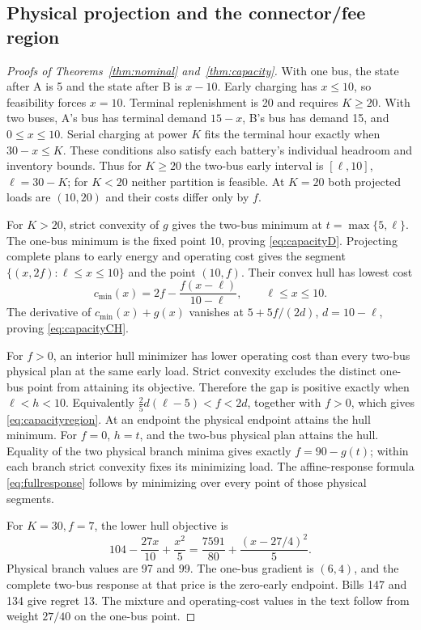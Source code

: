 \subsection{Physical projection and the connector/fee region}\label{app:capacity}
\begin{proof}[Proofs of Theorems~\ref{thm:nominal} and~\ref{thm:capacity}]
With one bus, the state after A is 5 and the state after B is $x-10$.
Early charging has $x\le10$, so feasibility forces $x=10$. Terminal
replenishment is 20 and requires $K\ge20$. With two buses, A's bus has
terminal demand $15-x$, B's bus has demand 15, and $0\le x\le10$.
Serial charging at power $K$ fits the terminal hour exactly when
$30-x\le K$. These conditions also satisfy each battery's individual
headroom and inventory bounds. Thus for $K\ge20$ the two-bus early
interval is $[\ell,10]$, $\ell=30-K$; for $K<20$ neither partition
is feasible. At $K=20$ both projected loads are $(10,20)$ and their
costs differ only by $f$.

For $K>20$, strict convexity of $g$ gives the two-bus minimum at
$t=\max\{5,\ell\}$. The one-bus minimum is the fixed point 10,
proving \eqref{eq:capacityD}. Projecting complete plans to early energy
and operating cost gives the segment $\{(x,2f):\ell\le x\le10\}$
and the point $(10,f)$. Their convex hull has lowest cost
\[
 c_{\min}(x)=2f-\frac{f(x-\ell)}{10-\ell},\qquad\ell\le x\le10.
\]
The derivative of $c_{\min}(x)+g(x)$ vanishes at
$5+5f/(2d)$, $d=10-\ell$, proving \eqref{eq:capacityCH}.

For $f>0$, an interior hull minimizer has lower operating cost than every
two-bus physical plan at the same early load. Strict convexity excludes
the distinct one-bus point from attaining its objective. Therefore the
gap is positive exactly when $\ell<h<10$. Equivalently
$\tfrac25d(\ell-5)<f<2d$, together with $f>0$, which gives
\eqref{eq:capacityregion}. At an endpoint the physical endpoint attains
the hull minimum. For $f=0$, $h=t$, and the two-bus physical plan attains
the hull. Equality of the two physical branch minima gives exactly
$f=90-g(t)$; within each branch strict convexity fixes its minimizing
load. The affine-response formula \eqref{eq:fullresponse} follows by
minimizing over every point of those physical segments.

For $K=30,f=7$, the lower hull objective is
\[
104-\frac{27x}{10}+\frac{x^2}{5}
=\frac{7591}{80}+\frac{(x-27/4)^2}{5}.
\]
Physical branch values are 97
and 99. The one-bus gradient is $(6,4)$, and the complete two-bus
response at that price is the zero-early endpoint. Bills 147 and 134 give
regret 13. The mixture and operating-cost values in the text follow from
weight $27/40$ on the one-bus point.
\end{proof}

